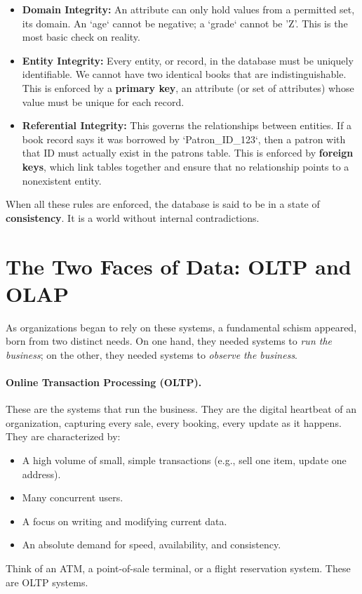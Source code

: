 \documentclass[12pt,a4paper]{article}
\begin{document}
\begin{itemize}
    \item \textbf{Domain Integrity:} An attribute can only hold values from a permitted set, its domain. An `age` cannot be negative; a `grade` cannot be 'Z'. This is the most basic check on reality.
    
    \item \textbf{Entity Integrity:} Every entity, or record, in the database must be uniquely identifiable. We cannot have two identical books that are indistinguishable. This is enforced by a \textbf{primary key}, an attribute (or set of attributes) whose value must be unique for each record.
    
    \item \textbf{Referential Integrity:} This governs the relationships between entities. If a book record says it was borrowed by `Patron_ID_123`, then a patron with that ID must actually exist in the patrons table. This is enforced by \textbf{foreign keys}, which link tables together and ensure that no relationship points to a nonexistent entity.
\end{itemize}

When all these rules are enforced, the database is said to be in a state of \textbf{consistency}. It is a world without internal contradictions.

\section{The Two Faces of Data: OLTP and OLAP}

As organizations began to rely on these systems, a fundamental schism appeared, born from two distinct needs. On one hand, they needed systems to \emph{run the business}; on the other, they needed systems to \emph{observe the business}.

\paragraph{Online Transaction Processing (OLTP).} These are the systems that run the business. They are the digital heartbeat of an organization, capturing every sale, every booking, every update as it happens. They are characterized by:
\begin{itemize}
    \item A high volume of small, simple transactions (e.g., sell one item, update one address).
    \item Many concurrent users.
    \item A focus on writing and modifying current data.
    \item An absolute demand for speed, availability, and consistency.
\end{itemize}
Think of an ATM, a point-of-sale terminal, or a flight reservation system. These are OLTP systems.
\end{document}
